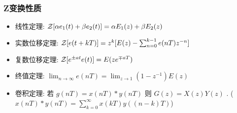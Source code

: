 \documentclass[table]{beamer}
\begin{document}
\begin{frame}
\frametitle{Z变换性质}
\label{sec-1-6}

\begin{itemize}
\item <2->线性定理:    ${\cal Z}[\alpha e_1(t)+\beta e_2(t)]=\alpha E_1(z)+\beta E_2(z)$
\item <3->实数位移定理:  ${\cal Z}[e(t+kT)] = z^k[E(z)-\sum_{n=0}^{k-1}e(nT)z^{-n}]$
\item <4->复数位移定理:  ${\cal Z}[e^{\pm at}e(t)] = E(ze^{\mp aT})$
\item <5->终值定理:  $\lim_{n\rightarrow\infty}e(nT)=\lim_{z\rightarrow 1}(1-z^{-1})E(z)$
\item <6->卷积定理: 若  $g(nT)=x(nT)*y(nT)$  则  $G(z)=X(z)Y(z)$  . ($x(nT)*y(nT)=\sum_{k=0}^{\infty}x(kT)y((n-k)T)$)
\end{itemize}
\end{frame}
\end{document}
